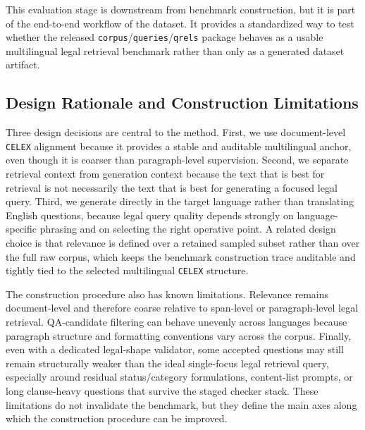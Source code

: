 This evaluation stage is downstream from benchmark construction, but it is part of the end-to-end workflow of the dataset. It provides a standardized way to test whether the released \texttt{corpus}/\texttt{queries}/\texttt{qrels} package behaves as a usable multilingual legal retrieval benchmark rather than only as a generated dataset artifact.

\subsection{Design Rationale and Construction Limitations}

Three design decisions are central to the method. First, we use document-level \texttt{CELEX} alignment because it provides a stable and auditable multilingual anchor, even though it is coarser than paragraph-level supervision. Second, we separate retrieval context from generation context because the text that is best for retrieval is not necessarily the text that is best for generating a focused legal query. Third, we generate directly in the target language rather than translating English questions, because legal query quality depends strongly on language-specific phrasing and on selecting the right operative point. A related design choice is that relevance is defined over a retained sampled subset rather than over the full raw corpus, which keeps the benchmark construction trace auditable and tightly tied to the selected multilingual \texttt{CELEX} structure.

The construction procedure also has known limitations. Relevance remains document-level and therefore coarse relative to span-level or paragraph-level legal retrieval. QA-candidate filtering can behave unevenly across languages because paragraph structure and formatting conventions vary across the corpus. Finally, even with a dedicated legal-shape validator, some accepted questions may still remain structurally weaker than the ideal single-focus legal retrieval query, especially around residual status/category formulations, content-list prompts, or long clause-heavy questions that survive the staged checker stack. These limitations do not invalidate the benchmark, but they define the main axes along which the construction procedure can be improved.
